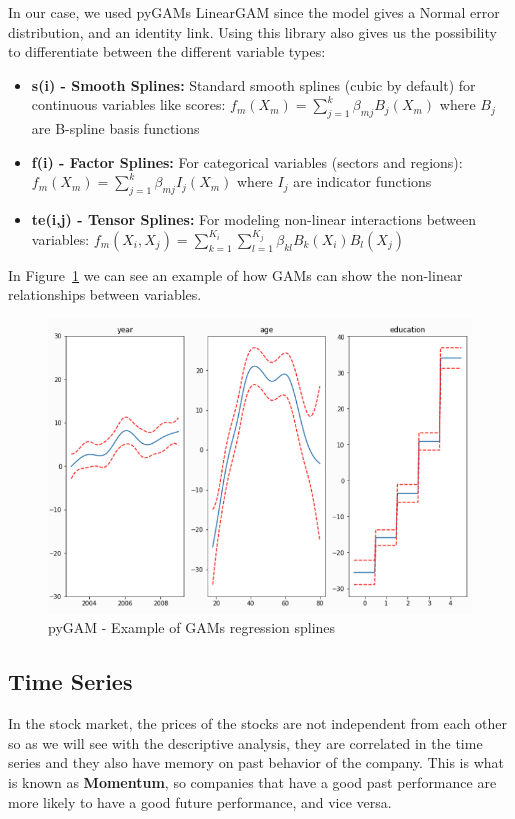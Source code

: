\documentclass[11pt,english,a4paper,hidelinks]{book}
\begin{document}
\noindent In our case, we used pyGAMs LinearGAM since the model gives a Normal error distribution, and an identity link. Using this library also gives us the possibility to differentiate between the different variable types:

\begin{itemize}
    \item \textbf{s(i) - Smooth Splines:} Standard smooth splines (cubic by default) for continuous variables like scores: \(f_m(X_m) = \sum_{j=1}^{k} \beta_{mj} B_j(X_m)\) where \(B_j\) are B-spline basis functions
    \item \textbf{f(i) - Factor Splines:} For categorical variables (sectors and regions): \(f_m(X_m) = \sum_{j=1}^{k} \beta_{mj} I_j(X_m)\) where \(I_j\) are indicator functions
    \item \textbf{te(i,j) - Tensor Splines:} For modeling non-linear interactions between variables: \(f_m(X_i, X_j) = \sum_{k=1}^{K_i} \sum_{l=1}^{K_j} \beta_{kl} B_k(X_i) B_l(X_j)\)
\end{itemize}

\noindent In Figure~\ref{fig:splines_example} we can see an example of how GAMs can show the non-linear relationships between variables.
\begin{figure}[H]
    \centering
    \includegraphics[width=1\textwidth]{images/code/descriptive analysis/gam/splines_example.png}
    \caption{pyGAM - Example of GAMs regression splines}
    \label{fig:splines_example}
\end{figure}

\subsection{Time Series}
In the stock market, the prices of the stocks are not independent from each other so as we will see with the descriptive analysis, they are correlated in the time series and they also have memory on past behavior of the company. This is what is known as \textbf{Momentum}, so companies that have a good past performance are more likely to have a good future performance, and vice versa.
\end{document}
